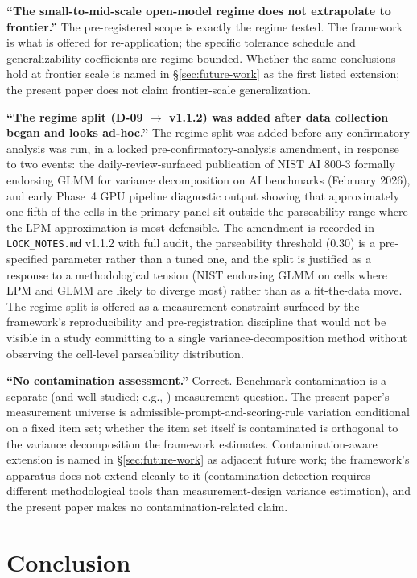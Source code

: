 \documentclass[11pt]{article}
\begin{document}
\textbf{``The small-to-mid-scale open-model regime does not extrapolate to frontier.''} The pre-registered scope is exactly the regime tested. The framework is what is offered for re-application; the specific tolerance schedule and generalizability coefficients are regime-bounded. Whether the same conclusions hold at frontier scale is named in §\ref{sec:future-work} as the first listed extension; the present paper does not claim frontier-scale generalization.

\textbf{``The regime split (D-09 $\to$ v1.1.2) was added after data collection began and looks ad-hoc.''} The regime split was added before any confirmatory analysis was run, in a locked pre-confirmatory-analysis amendment, in response to two events: the daily-review-surfaced publication of NIST AI 800-3 \citep{nist2026statmodels} formally endorsing GLMM for variance decomposition on AI benchmarks (February 2026), and early Phase~4 GPU pipeline diagnostic output showing that approximately one-fifth of the cells in the primary panel sit outside the parseability range where the LPM approximation is most defensible. The amendment is recorded in \texttt{LOCK\_NOTES.md} v1.1.2 with full audit, the parseability threshold ($0.30$) is a pre-specified parameter rather than a tuned one, and the split is justified as a response to a methodological tension (NIST endorsing GLMM on cells where LPM and GLMM are likely to diverge most) rather than as a fit-the-data move. The regime split is offered as a measurement constraint surfaced by the framework's reproducibility and pre-registration discipline that would not be visible in a study committing to a single variance-decomposition method without observing the cell-level parseability distribution.

\textbf{``No contamination assessment.''} Correct. Benchmark contamination is a separate (and well-studied; e.g., \citet{hasan2025pitfalls}) measurement question. The present paper's measurement universe is admissible-prompt-and-scoring-rule variation conditional on a fixed item set; whether the item set itself is contaminated is orthogonal to the variance decomposition the framework estimates. Contamination-aware extension is named in §\ref{sec:future-work} as adjacent future work; the framework's apparatus does not extend cleanly to it (contamination detection requires different methodological tools than measurement-design variance estimation), and the present paper makes no contamination-related claim.

\section{Conclusion}
\label{sec:conclusion}
\end{document}
